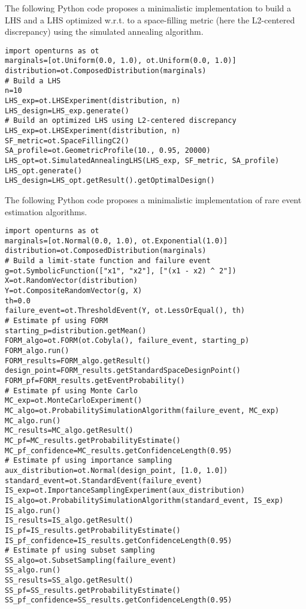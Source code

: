 \begin{otexample}
    The following Python code proposes a minimalistic \ot implementation to build a LHS and 
    a LHS optimized w.r.t. to a space-filling metric (here the L2-centered discrepancy) using the simulated annealing algorithm. 
    \lstset{style=mystyle, language=python}
\begin{lstlisting}
import openturns as ot
marginals=[ot.Uniform(0.0, 1.0), ot.Uniform(0.0, 1.0)]
distribution=ot.ComposedDistribution(marginals)
# Build a LHS
n=10
LHS_exp=ot.LHSExperiment(distribution, n)
LHS_design=LHS_exp.generate()
# Build an optimized LHS using L2-centered discrepancy
LHS_exp=ot.LHSExperiment(distribution, n)
SF_metric=ot.SpaceFillingC2()
SA_profile=ot.GeometricProfile(10., 0.95, 20000)
LHS_opt=ot.SimulatedAnnealingLHS(LHS_exp, SF_metric, SA_profile)
LHS_opt.generate()
LHS_design=LHS_opt.getResult().getOptimalDesign()
\end{lstlisting}
\end{otexample}


\begin{otexample}
    The following Python code proposes a minimalistic \ot implementation of rare event estimation algorithms. 
    \lstset{style=mystyle, language=python}
\begin{lstlisting}
import openturns as ot
marginals=[ot.Normal(0.0, 1.0), ot.Exponential(1.0)]
distribution=ot.ComposedDistribution(marginals)
# Build a limit-state function and failure event
g=ot.SymbolicFunction(["x1", "x2"], ["(x1 - x2) ^ 2"])
X=ot.RandomVector(distribution)
Y=ot.CompositeRandomVector(g, X)
th=0.0
failure_event=ot.ThresholdEvent(Y, ot.LessOrEqual(), th)
# Estimate pf using FORM
starting_p=distribution.getMean()
FORM_algo=ot.FORM(ot.Cobyla(), failure_event, starting_p)
FORM_algo.run()
FORM_results=FORM_algo.getResult()
design_point=FORM_results.getStandardSpaceDesignPoint()
FORM_pf=FORM_results.getEventProbability()
# Estimate pf using Monte Carlo 
MC_exp=ot.MonteCarloExperiment()
MC_algo=ot.ProbabilitySimulationAlgorithm(failure_event, MC_exp)
MC_algo.run()
MC_results=MC_algo.getResult()
MC_pf=MC_results.getProbabilityEstimate()
MC_pf_confidence=MC_results.getConfidenceLength(0.95)
# Estimate pf using importance sampling
aux_distribution=ot.Normal(design_point, [1.0, 1.0])
standard_event=ot.StandardEvent(failure_event)
IS_exp=ot.ImportanceSamplingExperiment(aux_distribution)
IS_algo=ot.ProbabilitySimulationAlgorithm(standard_event, IS_exp)
IS_algo.run()
IS_results=IS_algo.getResult()
IS_pf=IS_results.getProbabilityEstimate()
IS_pf_confidence=IS_results.getConfidenceLength(0.95)
# Estimate pf using subset sampling
SS_algo=ot.SubsetSampling(failure_event)
SS_algo.run()
SS_results=SS_algo.getResult()
SS_pf=SS_results.getProbabilityEstimate()
SS_pf_confidence=SS_results.getConfidenceLength(0.95)
\end{lstlisting}
\end{otexample}


